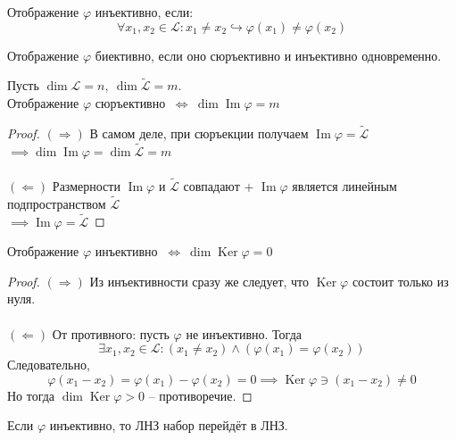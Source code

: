 \documentclass[11pt]{article}
\DeclareMathOperator{\Imm}{Im}
\DeclareMathOperator{\Ker}{Ker}
\begin{document}
\begin{definition}
  Отображение $\varphi$ инъективно, если: 
  \[\forall x_1, x_2 \in \mathcal{L}: x_1 \neq x_2 \hookrightarrow \varphi (x_1) \neq \varphi (x_2)\]
\end{definition}

\begin{definition}
  Отображение $\varphi$ биективно, если оно сюръективно и инъективно одновременно.
\end{definition}

\begin{lemma}
  Пусть $\dim \mathcal{L} = n, \ \dim \widetilde{\mathcal{L}} = m$. \\
  Отображение $\varphi$ сюръективно $\ \Longleftrightarrow \ \dim \Imm \varphi = m$
\end{lemma}

\begin{proof}
  $(\Longrightarrow)$ В самом деле, при сюръекции получаем $\Imm \varphi = \widetilde{\mathcal{L}}$ \\
  $\implies \dim \Imm \varphi = \dim \widetilde{\mathcal{L}} = m$ \\ \\
  $(\Longleftarrow)$ Размерности $\Imm \varphi$ и $\widetilde{\mathcal{L}}$ совпадают + 
  $\Imm \varphi$ является линейным подпространством $\widetilde{\mathcal{L}}$ \\
  $\implies \Imm \varphi = \widetilde{\mathcal{L}}$
\end{proof}

\begin{lemma}
  Отображение $\varphi$ инъективно $\ \Longleftrightarrow \ \dim \Ker \varphi = 0$ 
\end{lemma}

\begin{proof}
  $(\Longrightarrow)$ Из инъективности сразу же следует, что $\Ker \varphi$ состоит только из нуля. \\ \\
  $(\Longleftarrow)$ От противного: пусть $\varphi$ не инъективно. Тогда 
  \[\exists x_1, x_2 \in \mathcal{L}: (x_1 \neq x_2) \wedge (\varphi(x_1) = \varphi(x_2))\]
  Следовательно, \[\varphi(x_1 - x_2) = \varphi(x_1) - \varphi(x_2) = 0 \implies \Ker \varphi \ni (x_1 - x_2) \neq 0\] 
  Но тогда $\dim \Ker \varphi > 0$ -- противоречие.
\end{proof}

\begin{lemma}
  Если $\varphi$ инъективно, то ЛНЗ набор перейдёт в ЛНЗ.
\end{lemma}
\end{document}
